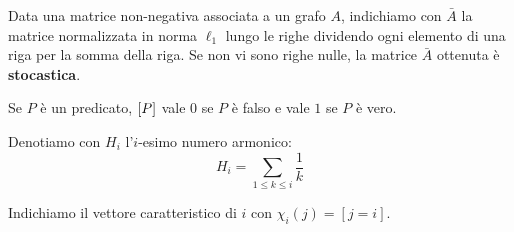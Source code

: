 \documentclass[\main/main.tex]{subfiles}
\begin{document}
\begin{multicols}{2}
\begin{definition}
    Data una matrice non-negativa associata a un grafo \(A\), indichiamo con \(\bar{A}\) la matrice normalizzata in norma \(\ell_1\) lungo le righe dividendo ogni elemento di una riga per la somma della riga. Se non vi sono righe nulle, la matrice \(\bar{A}\) ottenuta è \textbf{stocastica}.
\end{definition}
\begin{definition}
    Se \(P\) è un predicato, \(\left[P\right]\) vale \(0\) se \(P\) è falso e vale \(1\) se \(P\) è vero.
\end{definition}
\begin{definition}
    Denotiamo con \(H_i\) l'\(i\)-esimo numero armonico:
    \[
        H_i = \sum_{1 \leq k \leq i} \frac{1}{k}
    \]
\end{definition}
\begin{definition}
    Indichiamo il vettore caratteristico di \(i\) con \(
        \chi_{i}(j)=[j=i]
    \).
\end{definition}
\end{multicols}
\clearpage
\end{document}
